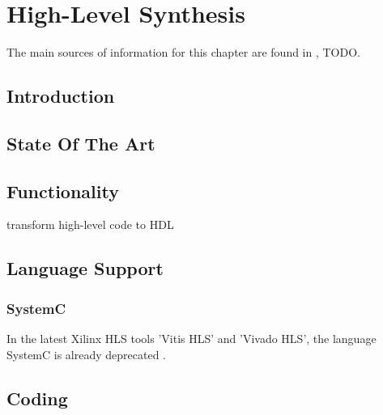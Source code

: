 \chapter{High-Level Synthesis}
\label{cha:HLS}

The main sources of information for this chapter are found in \cite{VivadoUgHLS}, TODO.

\section{Introduction}

\section{State Of The Art}

\section{Functionality}
transform high-level code to HDL

\section{Language Support}


\subsection{\cplusplus}

\subsection{SystemC}

In the latest Xilinx HLS tools 'Vitis HLS' and 'Vivado HLS', the language SystemC is already deprecated \cite{VivadoHlsSystemC}.\\

\section{Coding}

